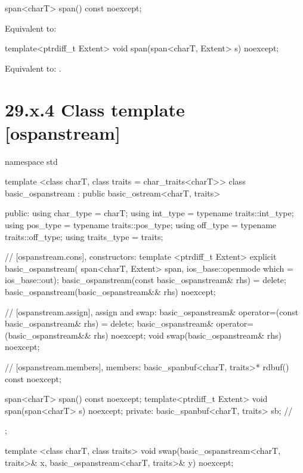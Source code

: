 \documentclass[ebook,11pt,article]{memoir}
\renewcommand{\iref}[1]{[#1]}
\begin{document}
\begin{itemdecl}
span<charT> span() const noexcept;
\end{itemdecl}

\begin{itemdescr}
\pnum
\effects Equivalent to:\\
\end{itemdescr}

\begin{itemdecl}
template<ptrdiff_t Extent>
void span(span<charT, Extent> s) noexcept;
\end{itemdecl}

\begin{itemdescr}
\pnum
\effects
Equivalent to:
.
\end{itemdescr}

\section{29.x.4 Class template  [ospanstream] }

\begin{codeblock}
namespace std {
  template <class charT, class traits = char_traits<charT>>
  class basic_ospanstream
    : public basic_ostream<charT, traits> {
  public:
    using char_type      = charT;
    using int_type       = typename traits::int_type;
    using pos_type       = typename traits::pos_type;
    using off_type       = typename traits::off_type;
    using traits_type    = traits;

    // \iref{ospanstream.cons}, constructors:
    template <ptrdiff_t Extent>
    explicit basic_ospanstream(
      span<charT, Extent> span,
      ios_base::openmode which = ios_base::out);
    basic_ospanstream(const basic_ospanstream& rhs) = delete;
    basic_ospanstream(basic_ospanstream&& rhs) noexcept;

    // \iref{ospanstream.assign}, assign and swap:
    basic_ospanstream& operator=(const basic_ospanstream& rhs) = delete;
    basic_ospanstream& operator=(basic_ospanstream&& rhs) noexcept;
    void swap(basic_ospanstream& rhs) noexcept;

    // \iref{ospanstream.members}, members:
    basic_spanbuf<charT, traits>* rdbuf() const noexcept;

    span<charT> span() const noexcept;
	template<ptrdiff_t Extent>
    void span(span<charT> s) noexcept;
  private:
    basic_spanbuf<charT, traits> sb; // \expos
  };

  template <class charT, class traits>
    void swap(basic_ospanstream<charT, traits>& x,
              basic_ospanstream<charT, traits>& y) noexcept;
}
\end{codeblock}
\end{document}
